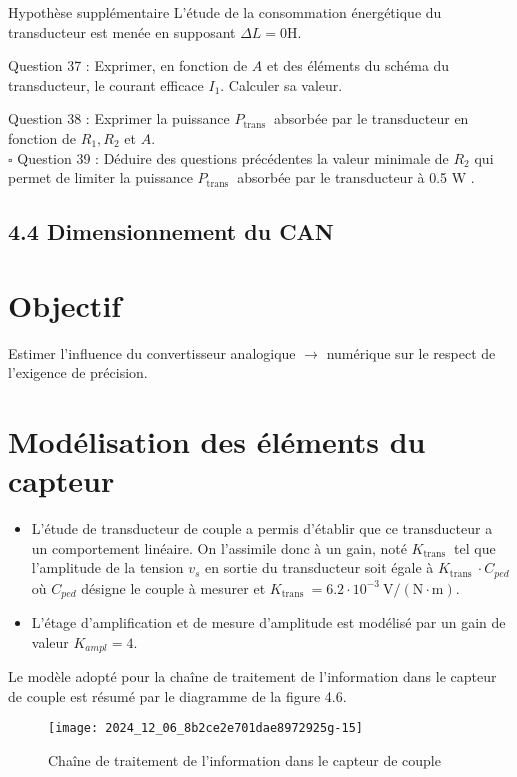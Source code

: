 Hypothèse supplémentaire L'étude de la consommation énergétique du transducteur est menée en supposant \(\Delta L=0 \mathrm{H}\).

Question 37 : Exprimer, en fonction de \(A\) et des éléments du schéma du transducteur, le courant efficace \(I_{1}\). Calculer sa valeur.

Question 38 : Exprimer la puissance \(P_{\text {trans }}\) absorbée par le transducteur en fonction de \(R_{1}, R_{2}\) et \(A\).\\
\(\square\) Question 39 : Déduire des questions précédentes la valeur minimale de \(R_{2}\) qui permet de limiter la puissance \(P_{\text {trans }}\) absorbée par le transducteur à 0.5 W .

\subsection{4.4 Dimensionnement du CAN}
\section{Objectif}
Estimer l'influence du convertisseur analogique \(\rightarrow\) numérique sur le respect de l'exigence de précision.

\section{Modélisation des éléments du capteur}
\begin{itemize}
  \item L'étude de transducteur de couple a permis d'établir que ce transducteur a un comportement linéaire. On l'assimile donc à un gain, noté \(K_{\text {trans }}\) tel que l'amplitude de la tension \(v_{s}\) en sortie du transducteur soit égale à \(K_{\text {trans }} \cdot C_{p e d}\) où \(C_{p e d}\) désigne le couple à mesurer et \(K_{\text {trans }}=6.2 \cdot 10^{-3} \mathrm{~V} /(\mathrm{N} \cdot \mathrm{m})\).
  \item L'étage d'amplification et de mesure d'amplitude est modélisé par un gain de valeur \(K_{a m p l}=4\).
\end{itemize}

Le modèle adopté pour la chaîne de traitement de l'information dans le capteur de couple est résumé par le diagramme de la figure 4.6.\\

\begin{figure}[!htb]
\begin{center}
\texttt{[image: 2024\_12\_06\_8b2ce2e701dae8972925g-15]}
\caption{Chaîne de traitement de l'information dans le capteur de couple \label{fig11}}
\end{center}
\end{figure}

